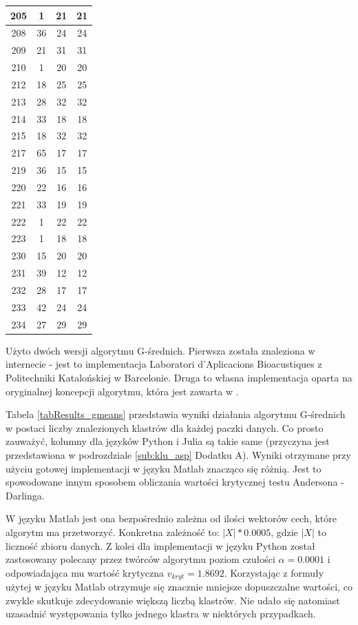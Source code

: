 \begin{table}[!tp]
\begin{tabular}{|c|c|c|c|}
		205 &  1 & 21 & 21\\ \hline
		208 & 36 & 24 & 24\\ \hline
		209 & 21 & 31 & 31\\ \hline
		210 &  1 & 20 & 20\\ \hline
		212 & 18 & 25 & 25\\ \hline
		213 & 28 & 32 & 32\\ \hline
		214 & 33 & 18 & 18\\ \hline
		215 & 18 & 32 & 32\\ \hline
		217 & 65 & 17 & 17\\ \hline
		219 & 36 & 15 & 15\\ \hline
		220 & 22 & 16 & 16\\ \hline	
		221 & 33 & 19 & 19\\ \hline
		222 &  1 & 22 & 22\\ \hline
		223 &  1 & 18 & 18\\ \hline
		230 & 15 & 20 & 20\\ \hline
		231 & 39 & 12 & 12\\ \hline
		232 & 28 & 17 & 17\\ \hline
		233 & 42 & 24 & 24\\ \hline
		234 & 27 & 29 & 29\\ \hline
	\end{tabular}
\end{table}

\qquad Użyto dwóch wersji algorytmu G-średnich. Pierwsza została znaleziona w internecie - jest to implementacja Laboratori d'Aplicacions Bioacustiques z Politechniki Katalońskiej w Barcelonie. Druga to własna implementacja oparta na oryginalnej koncepcji algorytmu, która jest zawarta w \cite{GMeans}.

Tabela \ref{tabResults_gmeans} przedstawia wyniki działania algorytmu G-średnich w postaci liczby znalezionych klastrów dla każdej paczki danych. Co prosto zauważyć, kolumny dla języków Python i Julia są takie same (przyczyna jest przedstawiona w podrozdziale \ref{sub:klu_asp} Dodatku A). Wyniki otrzymane przy użyciu gotowej implementacji w języku Matlab znacząco się różnią. Jest to spowodowane innym sposobem obliczania wartości krytycznej testu Andersona - Darlinga.

W języku Matlab jest ona bezpośrednio zależna od ilości wektorów cech, które algorytm ma przetworzyć. Konkretna zależność to: $|X| * 0.0005$, gdzie $|X|$ to liczność zbioru danych. Z kolei dla implementacji w języku Python został zastosowany polecany przez twórców algorytmu poziom czułości $\alpha = 0.0001$ i odpowiadająca mu wartość krytyczna $v_{kryt} = 1.8692$. Korzystając z formuły użytej w języku Matlab otrzymuje się znacznie mniejsze dopuszczalne wartości, co zwykle skutkuje zdecydowanie większą liczbą klastrów. Nie udało się natomiast uzasadnić występowania tylko jednego klastra w niektórych przypadkach.


